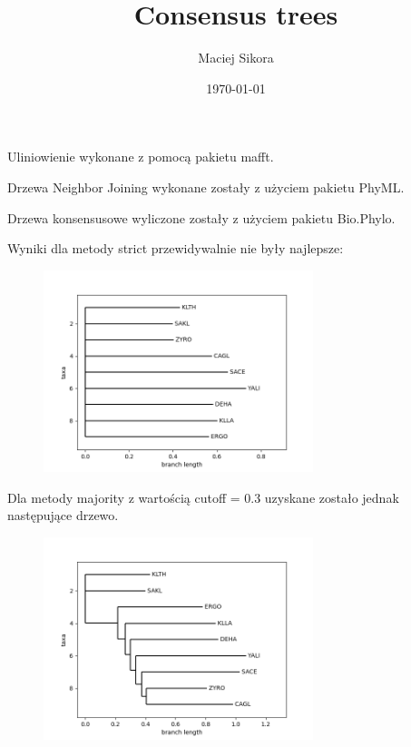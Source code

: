\documentclass[12pt]{article}
\title{Consensus trees}
\author{Maciej Sikora}
\date{\specialdate\today}
\begin{document}
\maketitle

Uliniowienie wykonane z pomocą pakietu mafft.

Drzewa Neighbor Joining wykonane zostały z użyciem pakietu PhyML.

Drzewa konsensusowe  wyliczone zostały z użyciem pakietu Bio.Phylo.

Wyniki dla metody strict przewidywalnie nie były najlepsze:
\begin{figure}[H]
\begin{center}
\includegraphics[width=0.7\textwidth]{strict}
\end{center}
\end{figure}


Dla metody majority z wartością cutoff = 0.3 uzyskane zostało jednak następujące drzewo.
\begin{figure}[H]
\begin{center}
\includegraphics[width=0.7\textwidth]{cons_30}
\end{center}
\end{figure}
\end{document}
